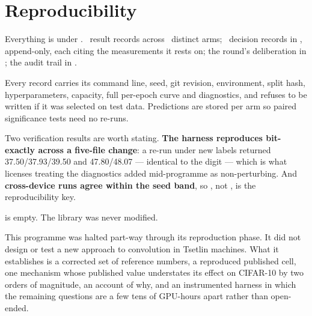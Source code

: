\section{Reproducibility}

Everything is under . \NResults\ result records across \NArms\ distinct
arms; \NDecisions\ decision records in , append-only, each citing the measurements
it rests on; the round's deliberation in ; the audit trail in .

Every record carries its command line, seed, git revision, environment, split hash, hyperparameters,
capacity, full per-epoch curve and diagnostics, and refuses to be written if it was selected on test
data. Predictions are stored per arm so paired significance tests need no re-runs.

Two verification results are worth stating. \textbf{The harness reproduces bit-exactly across a
five-file change}: a re-run under new labels returned 37.50/37.93/39.50 and 47.80/48.07 --- identical
to the digit --- which is what licenses treating the diagnostics added mid-programme as
non-perturbing. And \textbf{cross-device runs agree within the seed band}, so ,
not , is the reproducibility key.

 is empty. The library was never modified.

\vspace{4mm}
\begin{ttcallout}[Status]
This programme was halted part-way through its reproduction phase. It did not design or test a new
approach to convolution in Tsetlin machines. What it establishes is a corrected set of reference
numbers, a reproduced published cell, one mechanism whose published value understates its effect on
CIFAR-10 by two orders of magnitude, an account of why, and an instrumented harness in which the
remaining questions are a few tens of GPU-hours apart rather than open-ended.
\end{ttcallout}
